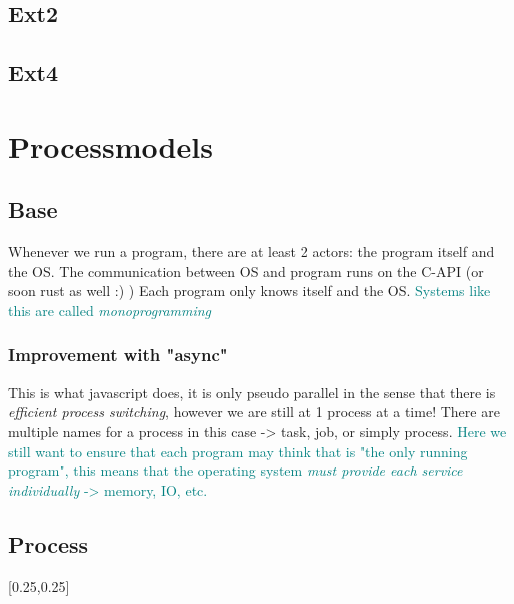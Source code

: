 \documentclass[main.tex,fontsize=8pt,paper=a4,paper=portrait,DIV=calc,]{scrartcl}
\begin{document}
\subsection{Ext2}

\subsection{Ext4}

\section{Processmodels}
\subsection{Base}
Whenever we run a program, there are at least 2 actors: the program itself and the OS.\newline
The communication between OS and program runs on the C-API (or soon rust as well :) )\newline
Each program only knows itself and the OS.\newline
\textcolor{teal}{Systems like this are called \emph{monoprogramming}}

\subsubsection{Improvement with "async"}
This is what javascript does, it is only pseudo parallel in the sense that there is \emph{efficient process switching}, however we are still at 1 process at a time!\newline
There are multiple names for a process in this case -> task, job, or simply process. \newline
\newline
\textcolor{teal}{Here we still want to ensure that each program may think that is "the only running program",\newline
this means that the operating system \emph{must provide each service individually} -> memory, IO, etc. }

\subsection{Process}
[0.25,0.25]
\end{document}
